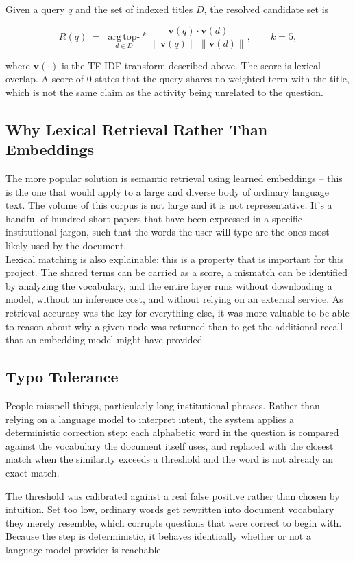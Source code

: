 Given a query $q$ and the set of indexed titles $D$, the resolved candidate set is

\[
R(q) \;=\; \operatorname*{arg\,top-}_{d \in D}{}^{k}\;
\frac{\mathbf{v}(q)\cdot\mathbf{v}(d)}{\lVert \mathbf{v}(q)\rVert\,\lVert \mathbf{v}(d)\rVert},
\qquad k = 5,
\]

where $\mathbf{v}(\cdot)$ is the TF-IDF transform described above. The score is lexical
overlap. A score of $0$ states that the query shares no weighted term with the title, which
is not the same claim as the activity being unrelated to the question.

\subsection{Why Lexical Retrieval Rather Than Embeddings}

The more popular solution is semantic retrieval using learned embeddings – this is the one that would apply to a large and diverse body of ordinary language text. The volume of this corpus is not large and it is not representative. It's a handful of hundred short papers that have been expressed in a specific institutional jargon, such that the words the user will type are the ones most likely used by the document.\\[0.3cm]
Lexical matching is also explainable: this is a property that is important for this project. The shared terms can be carried as a score, a mismatch can be identified by analyzing the vocabulary, and the entire layer runs without downloading a model, without an inference cost, and without relying on an external service. As retrieval accuracy was the key for everything else, it was more valuable to be able to reason about why a given node was returned than to get the additional recall that an embedding model might have provided.

\subsection{Typo Tolerance}

People misspell things, particularly long institutional phrases. Rather than relying on a language model to interpret intent, the system applies a deterministic correction step: each alphabetic word in the question is compared against the vocabulary the document itself uses, and replaced with the closest match when the similarity exceeds a threshold and the word is not already an exact match.

The threshold was calibrated against a real false positive rather than chosen by intuition. Set too low, ordinary words get rewritten into document vocabulary they merely resemble, which corrupts questions that were correct to begin with. Because the step is deterministic, it behaves identically whether or not a language model provider is reachable.

